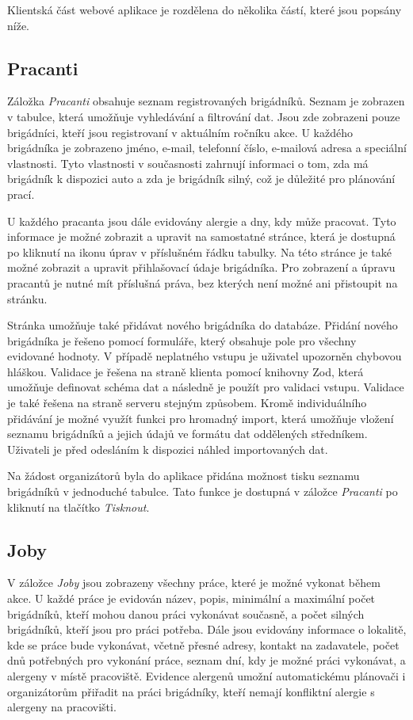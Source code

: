 Klientská část webové aplikace je rozdělena do několika částí, které jsou popsány níže.

\subsection{Pracanti}

Záložka \textit{Pracanti} obsahuje seznam registrovaných brigádníků. Seznam je zobrazen v tabulce, která umožňuje vyhledávání a filtrování dat.
Jsou zde zobrazeni pouze brigádníci, kteří jsou registrovaní v aktuálním ročníku akce. U každého brigádníka je zobrazeno jméno, e-mail, telefonní číslo,
e-mailová adresa a speciální vlastnosti. Tyto vlastnosti v současnosti zahrnují informaci o tom, zda má brigádník k dispozici auto a zda je brigádník silný,
což je důležité pro plánování prací.

U každého pracanta jsou dále evidovány alergie a dny, kdy může pracovat. Tyto informace je možné zobrazit a upravit na samostatné stránce, která je dostupná
po kliknutí na ikonu úprav v příslušném řádku tabulky. Na této stránce je také možné zobrazit a upravit přihlašovací údaje brigádníka. Pro zobrazení a úpravu
pracantů je nutné mít příslušná práva, bez kterých není možné ani přistoupit na stránku.

Stránka umožňuje také přidávat nového brigádníka do databáze. Přidání nového brigádníka je řešeno pomocí formuláře, který obsahuje pole pro všechny evidované
hodnoty. V případě neplatného vstupu je uživatel upozorněn chybovou hláškou. Validace je řešena na straně klienta pomocí knihovny Zod, která umožňuje definovat
schéma dat a následně je použít pro validaci vstupu. Validace je také řešena na straně serveru stejným způsobem. Kromě individuálního přidávání je možné využít
funkci pro hromadný import, která umožňuje vložení seznamu brigádníků a jejich údajů ve formátu dat oddělených středníkem. Uživateli je před odesláním
k dispozici náhled importovaných dat.

Na žádost organizátorů byla do aplikace přidána možnost tisku seznamu brigádníků v jednoduché tabulce. Tato funkce je dostupná v záložce \textit{Pracanti} po kliknutí
na tlačítko \textit{Tisknout}.

\subsection{Joby}

V záložce \textit{Joby} jsou zobrazeny všechny práce, které je možné vykonat během akce. U každé práce je evidován název, popis, minimální
a maximální počet brigádníků, kteří mohou danou práci vykonávat současně, a počet silných brigádníků, kteří jsou pro práci potřeba. Dále jsou evidovány
informace o lokalitě, kde se práce bude vykonávat, včetně přesné adresy, kontakt na zadavatele, počet dnů potřebných pro vykonání práce, 
seznam dní, kdy je možné práci vykonávat, a alergeny v místě pracoviště. Evidence alergenů umožní automatickému plánovači i organizátorům přiřadit na práci brigádníky, kteří nemají
konfliktní alergie s alergeny na pracovišti. 

